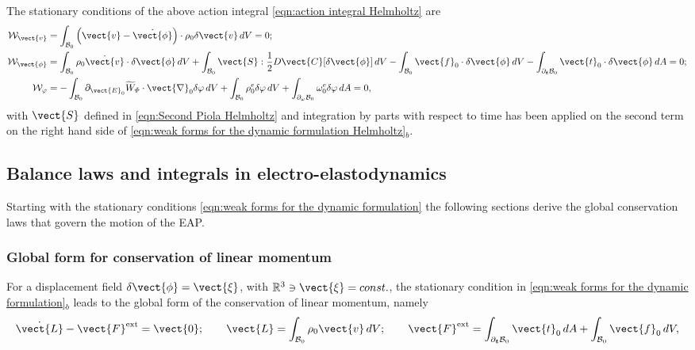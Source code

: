 The stationary conditions of the above action integral \eqref{eqn:action integral Helmholtz} are
%
\begin{equation}\label{eqn:weak forms for the dynamic formulation Helmholtz}
\begin{aligned}
{\mathcal{W}}_{\vect{v}}&= \int_{\mathcal{B}_0}\left(\vect{v} - \dot{\vect{\phi}}\right)\cdot\rho_0\delta\vect{v}\,dV=0;\\
%
{\mathcal{W}}_{\vect{\phi}} &  = \int_{\mathcal{B}_0}\rho_0\dot{\vect{v}}\cdot\delta\vect{\phi}\,dV + \int_{\mathcal{B}_0}\vect{S}:\frac{1}{2}D\vect{C}[\delta\vect{\phi}]\,dV\-  -\int_{\mathcal{B}_0}\vect{f}_0\cdot\delta\vect{\phi}\,dV-
\int_{\partial_{\boldsymbol{t}}\mathcal{B}_0}\vect{t}_0\cdot\delta\vect{\phi}\,dA=0;\\
%
{\mathcal{W}}_{\varphi}& =  -\int_{\mathcal{B}_0}\partial_{\vect{E}_0}\widetilde{W}_{\varPhi}\cdot\vect{\nabla}_0\delta\varphi\,dV+  \int_{\mathcal{B}_0}\rho_0^e\delta\varphi\,dV+
\int_{\partial_\omega\mathcal{B}_0}\omega^e_0\delta\varphi\,dA=0,
%
\end{aligned}
\end{equation}
%
with $\vect{S}$ defined in \eqref{eqn:Second Piola Helmholtz} and integration by parts with respect to time has been applied on the second term on the right hand side of \eqref{eqn:weak forms for the dynamic formulation Helmholtz}$_b$. 

\noindent\makebox[\linewidth]{\rule{\textwidth}{0.4pt}}


\subsection{Balance laws and integrals in electro-elastodynamics}

Starting with the stationary conditions \eqref{eqn:weak forms for the dynamic formulation} %
the following sections  derive the global conservation laws that govern the motion of the EAP.%

\subsubsection{Global form for conservation of linear momentum}\label{sec:conservation linear momentum global}

For a displacement field $\delta\vect{\phi} = \vect{\xi}$, with $\mathbb{R}^3\ni\vect{\xi}=const.$, the stationary condition in \eqref{eqn:weak forms for the dynamic formulation}$_b$ leads to the global form of the conservation of linear momentum, namely
%
\begin{equation}\label{eqn:global conservation linear momentum}
%
\dot{\vect{L}} - \vect{F}^{\text{ext}} = \vect{0};\qquad
%
{\vect{L}} = \int_{\mathcal{B}_0}\rho_0\vect{v}\,dV;\qquad
%
\vect{F}^{\text{ext}} =    
\int_{\partial_{\boldsymbol{t}}\mathcal{B}_0}\vect{t}_0\,dA
+\int_{\mathcal{B}_0}\vect{f}_0\,dV,
\end{equation}
%

